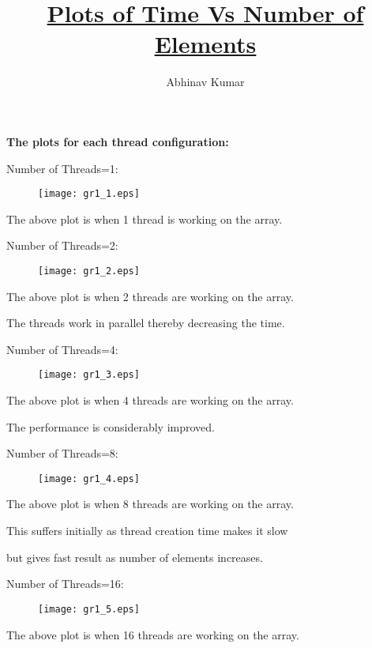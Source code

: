 \documentclass[13pt]{article}
\begin{document}
 
 
\title{\underline{Plots of Time Vs Number of Elements}}
\author{Abhinav Kumar}

\maketitle

{\Large{\bf{The plots for each thread configuration:}}

\bigskip
Number of Threads=1:
\begin{figure}[h]
\texttt{[image: gr1\_1.eps]}
\end{figure}

The above plot is when 1 thread is working on the array.

\newpage
Number of Threads=2:
\begin{figure}[h]
\texttt{[image: gr1\_2.eps]}
\end{figure}

The above plot is when 2 threads are working on the array.

The threads work in parallel thereby decreasing the time.

\newpage
Number of Threads=4:
\begin{figure}[h]
\texttt{[image: gr1\_3.eps]}
\end{figure}

The above plot is when 4 threads are working on the array.

The performance is considerably improved.

\newpage
Number of Threads=8:
\begin{figure}[h]
\texttt{[image: gr1\_4.eps]}
\end{figure}

The above plot is when 8 threads are working on the array.

This suffers initially as thread creation time makes it slow

but gives fast result as number of elements increases.

\newpage
Number of Threads=16:
\begin{figure}[h]
\texttt{[image: gr1\_5.eps]}
\end{figure}

The above plot is when 16 threads are working on the array.

}
\end{document}
